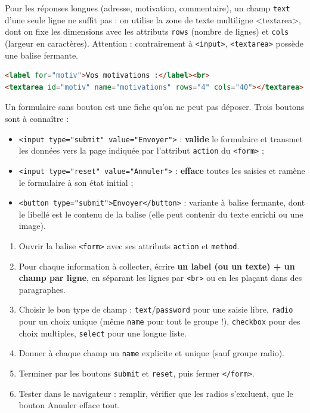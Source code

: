 \documentclass[11pt]{article}
\newcommand{\cle}[1]{{\popxbold\color{popdark}#1}}
\newcounter{popsec}
\newcounter{popsub}
\newcommand{\courssub}[1]{%
  \stepcounter{popsub}%
  \par\vspace{9pt}\noindent{\popxbold\fontsize{11.5}{13}\selectfont\color{popink}{\color{poporange}\thepopsec.\thepopsub}\hspace{6pt}#1}\par\nopagebreak\vspace{4pt}
}
\begin{document}
Pour les réponses longues (adresse, motivation, commentaire), un champ \texttt{text} d'une seule ligne ne suffit pas : on utilise la zone de texte multiligne \cle{<textarea>}, dont on fixe les dimensions avec les attributs \texttt{rows} (nombre de lignes) et \texttt{cols} (largeur en caractères). Attention : contrairement à \texttt{<input>}, \texttt{<textarea>} possède une balise fermante.

\begin{lstlisting}[language=HTML]
<label for="motiv">Vos motivations :</label><br>
<textarea id="motiv" name="motivations" rows="4" cols="40"></textarea>
\end{lstlisting}

\courssub{Les boutons cliquables}

Un formulaire sans bouton est une fiche qu'on ne peut pas déposer. Trois boutons sont à connaître :

\begin{propriete}
\begin{itemize}
\item \texttt{<input type="submit" value="Envoyer">} : \textbf{valide} le formulaire et transmet les données vers la page indiquée par l'attribut \texttt{action} du \texttt{<form>} ;
\item \texttt{<input type="reset" value="Annuler">} : \textbf{efface} toutes les saisies et ramène le formulaire à son état initial ;
\item \texttt{<button type="submit">Envoyer</button>} : variante à balise fermante, dont le libellé est le contenu de la balise (elle peut contenir du texte enrichi ou une image).
\end{itemize}
\end{propriete}

\begin{methode}
\begin{enumerate}
\item Ouvrir la balise \texttt{<form>} avec ses attributs \texttt{action} et \texttt{method}.
\item Pour chaque information à collecter, écrire \textbf{un label (ou un texte) + un champ par ligne}, en séparant les lignes par \texttt{<br>} ou en les plaçant dans des paragraphes.
\item Choisir le bon type de champ : \texttt{text}/\texttt{password} pour une saisie libre, \texttt{radio} pour un choix unique (même \texttt{name} pour tout le groupe !), \texttt{checkbox} pour des choix multiples, \texttt{select} pour une longue liste.
\item Donner à chaque champ un \texttt{name} explicite et unique (sauf groupe radio).
\item Terminer par les boutons \texttt{submit} et \texttt{reset}, puis fermer \texttt{</form>}.
\item Tester dans le navigateur : remplir, vérifier que les radios s'excluent, que le bouton Annuler efface tout.
\end{enumerate}
\end{methode}
\end{document}
